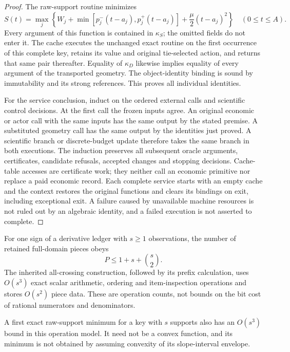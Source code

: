 \begin{proof}
The raw-support routine minimizes
\[
 S(t)=\max_j\left\{W_j+
        \min[p_j^-(t-a_j),p_j^+(t-a_j)]
                              +\frac\mu2(t-a_j)^2\right\}
 \quad(0\le t\le A).
\]
Every argument of this function is contained in $\kappa_S$; the omitted
fields do not enter it.  The cache executes the unchanged exact routine on
the first occurrence of this complete key, retains its value and original
tie-selected action, and returns that same pair thereafter.  Equality of
$\kappa_D$ likewise implies equality of every argument of the transported
geometry.  The object-identity binding is sound by immutability and its
strong references.  This proves all individual identities.

For the service conclusion, induct on the ordered external calls and
scientific control decisions.  At the first call the frozen inputs agree.
An original economic or actor call with the same inputs has the same output
by the stated premise.  A substituted geometry call has the same output by
the identities just proved.  A scientific branch or discrete-budget update
therefore takes the same branch in both executions.  The induction preserves
all subsequent oracle arguments, certificates, candidate refusals, accepted
changes and stopping decisions.  Cache-table accesses are certificate work;
they neither call an economic primitive nor replace a paid economic record.
Each complete service starts with an empty cache and the context restores the
original functions and clears its bindings on exit, including exceptional
exit.  A failure caused by unavailable machine resources is not ruled out by
an algebraic identity, and a failed execution is not asserted to complete.
\end{proof}

\begin{lemma}
\label{lem:cachepieces126c}
For one sign of a derivative ledger with $s\ge1$ observations, the number
of retained full-domain pieces obeys
\begin{equation}\label{eq:cachepieces126c}
 P\le 1+s+\binom{s}{2}.
\end{equation}
The inherited all-crossing construction, followed by its prefix calculation,
uses $O(s^3)$ exact scalar arithmetic, ordering and item-inspection operations
and stores $O(s^2)$ piece data.  These are operation counts, not bounds on
the bit cost of rational numerators and denominators.

A first exact raw-support minimum for a key with $s$ supports also has an
$O(s^3)$ bound in this operation model.  It need not be a convex function,
and its minimum is not obtained by assuming convexity of its slope-interval
envelope.
\end{lemma}

